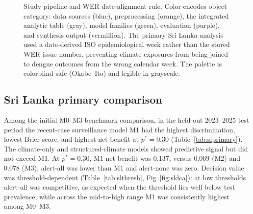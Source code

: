 \documentclass[11pt,a4paper]{article}
\begin{document}
\begin{figure}[htbp]
\caption{Study pipeline and WER date-alignment rule. Color encodes object category: data sources (blue), preprocessing (orange), the integrated analytic table (gray), model families (green), evaluation (purple), and synthesis output (vermillion). The primary Sri Lanka analysis used a date-derived ISO epidemiological week rather than the stored WER issue number, preventing climate exposures from being joined to dengue outcomes from the wrong calendar week. The palette is colorblind-safe (Okabe--Ito) and legible in grayscale.}
\label{fig:pipeline}
\end{figure}

\subsection{Sri Lanka primary comparison}
Among the initial M0--M3 benchmark comparison, in the held-out 2023--2025 test period the recent-case surveillance model M1 had the highest discrimination, lowest Brier score, and highest net benefit at $p^*=0.30$ (Table~\ref{tab:slprimary}). The climate-only and structured-climate models showed predictive signal but did not exceed M1. At $p^*=0.30$, M1 net benefit was 0.137, versus 0.069 (M2) and 0.078 (M3); alert-all was lower than M1 and alert-none was zero. Decision value was threshold-dependent (Table~\ref{tab:slthresh}, Fig~\ref{fig:sldca}): at low thresholds alert-all was competitive, as expected when the threshold lies well below test prevalence, while across the mid-to-high range M1 was consistently highest among M0--M3.
\end{document}
